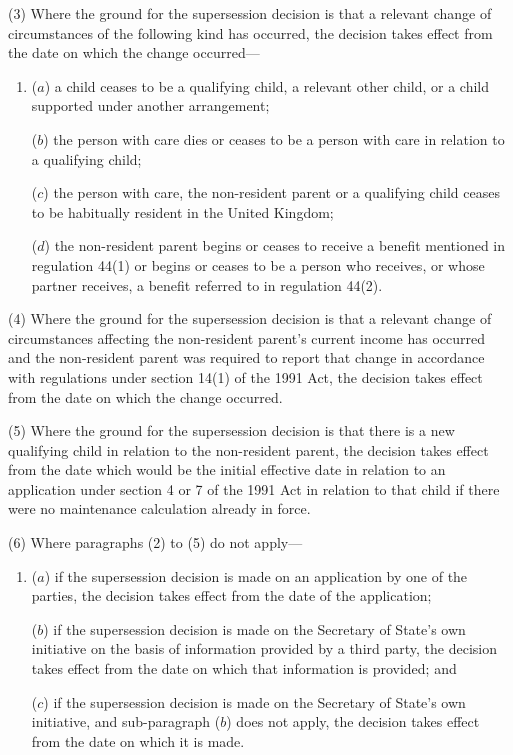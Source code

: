 \documentclass[12pt,a4paper]{article}
\begin{document}
(3) Where the ground for the supersession decision is that a relevant change of circumstances of the following kind has occurred, the decision takes effect from the date on which the change occurred—
\begin{enumerate}\item[]
($a$) a child ceases to be a qualifying child, a relevant other child, or a child supported under another arrangement;

($b$) the person with care dies or ceases to be a person with care in relation to a qualifying child;

($c$) the person with care, the non-resident parent or a qualifying child ceases to be habitually resident in the United Kingdom;

($d$) the non-resident parent begins or ceases to receive a benefit mentioned in regulation 44(1) or begins or ceases to be a person who receives, or whose partner receives, a benefit referred to in regulation 44(2).
\end{enumerate}

(4) Where the ground for the supersession decision is that a relevant change of circumstances affecting the non-resident parent’s current income has occurred and the non-resident parent was required to report that change in accordance with regulations under section 14(1) of the 1991 Act, the decision takes effect from the date on which the change occurred.

(5) Where the ground for the supersession decision is that there is a new qualifying child in relation to the non-resident parent, the decision takes effect from the date which would be the initial effective date in relation to an application under section 4 or 7 of the 1991 Act in relation to that child if there were no maintenance calculation already in force.

(6) Where paragraphs (2) to (5) do not apply—
\begin{enumerate}\item[]
($a$) if the supersession decision is made on an application by one of the parties, the decision takes effect from the date of the application;

($b$) if the supersession decision is made on the Secretary of State’s own initiative on the basis of information provided by a third party, the decision takes effect from the date on which that information is provided; and

($c$) if the supersession decision is made on the Secretary of State’s own initiative, and sub-paragraph ($b$)  does not apply, the decision takes effect from the date on which it is made.
\end{enumerate}
\end{document}

